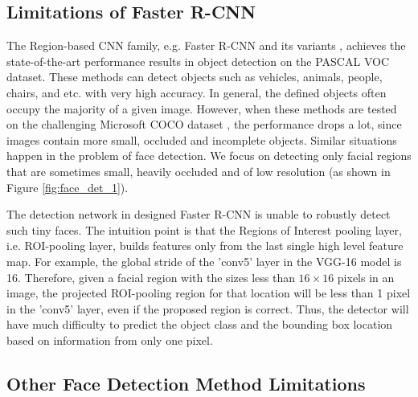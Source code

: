 \documentclass[10pt,journal,cspaper,compsoc]{IEEEtran}
\begin{document}
\subsection{Limitations of Faster R-CNN}

The Region-based CNN family, e.g. Faster R-CNN and its variants \cite{girshick2015fast}, achieves the state-of-the-art performance results in object detection on the PASCAL VOC dataset. These methods can detect objects such as vehicles, animals, people, chairs, and etc. with very high accuracy.
In general, the defined objects often occupy the majority of a given image. However, when these methods are tested on the challenging Microsoft COCO dataset \cite{lin2014microsoft}, the performance drops a lot, since images contain more small, occluded and incomplete objects. Similar situations happen in the problem of face detection. We focus on detecting only facial regions that are sometimes small, heavily occluded and of low resolution (as shown in Figure \ref{fig:face_det_1}).

The detection network in designed Faster R-CNN is unable to robustly detect such tiny faces. The intuition point is that the Regions of Interest pooling layer, i.e. ROI-pooling layer, builds features only from the last single high level feature map.
For example, the global stride of the 'conv5' layer in the VGG-16 model is 16. Therefore, given a facial region with the sizes less than $16\times16$ pixels in an image, the projected ROI-pooling region for that location will be less than 1 pixel in the 'conv5' layer, even if the proposed region is correct. Thus, the detector will have much difficulty to predict the object class and the bounding box location based on information from only one pixel.








\subsection{Other Face Detection Method Limitations}
\end{document}
